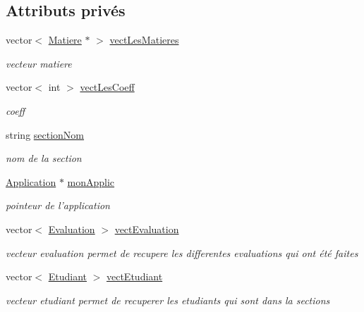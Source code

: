 \subsection*{Attributs privés}
\begin{DoxyCompactItemize}
\item 
vector$<$ \hyperlink{class_matiere}{Matiere} $\ast$ $>$ \hyperlink{class_section_ac7febeae3b093a5cac9e9df3a7474fe4}{vect\+Les\+Matieres}
\begin{DoxyCompactList}\small\item\em vecteur matiere \end{DoxyCompactList}\item 
vector$<$ int $>$ \hyperlink{class_section_a189240ee9f2d58c63be99a7c65e9ec4f}{vect\+Les\+Coeff}
\begin{DoxyCompactList}\small\item\em coeff \end{DoxyCompactList}\item 
string \hyperlink{class_section_a4bb51bd5ac41f66e9935f8e1e46e1c45}{section\+Nom}
\begin{DoxyCompactList}\small\item\em nom de la section \end{DoxyCompactList}\item 
\hyperlink{class_application}{Application} $\ast$ \hyperlink{class_section_a387b69bedffb009e38d88cb272030bd4}{mon\+Applic}
\begin{DoxyCompactList}\small\item\em pointeur de l'application \end{DoxyCompactList}\item 
vector$<$ \hyperlink{class_evaluation}{Evaluation} $>$ \hyperlink{class_section_a2c07b1c98085111f120142cbe087fd36}{vect\+Evaluation}
\begin{DoxyCompactList}\small\item\em vecteur evaluation permet de recupere les differentes evaluations qui ont été faites \end{DoxyCompactList}\item 
vector$<$ \hyperlink{class_etudiant}{Etudiant} $>$ \hyperlink{class_section_a878e894d29cdbecf573949260a3be53e}{vect\+Etudiant}
\begin{DoxyCompactList}\small\item\em vecteur etudiant permet de recuperer les etudiants qui sont dans la sections \end{DoxyCompactList}\end{DoxyCompactItemize}


